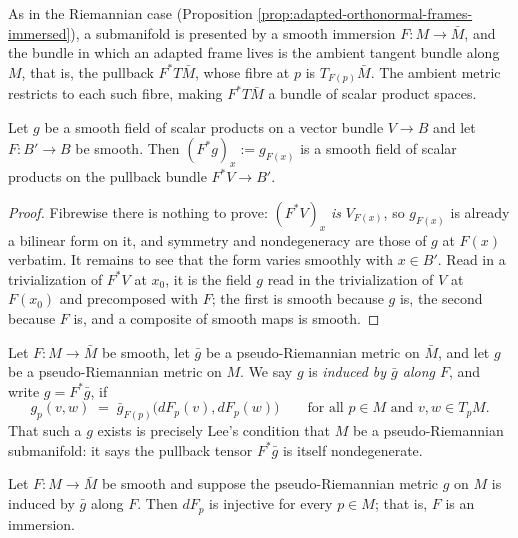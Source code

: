 As in the Riemannian case (Proposition \ref{prop:adapted-orthonormal-frames-immersed}), a submanifold is presented by a smooth immersion $F : M \to \bar{M}$, and the bundle in which an adapted frame lives is the ambient tangent bundle along $M$, that is, the pullback $F^* T\bar{M}$, whose fibre at $p$ is $T_{F(p)}\bar{M}$. The ambient metric restricts to each such fibre, making $F^* T\bar{M}$ a bundle of scalar product spaces.

\begin{lemma}
\label{lem:pullback-pseudo-metric-bundle}
\leanok
{}
Let $g$ be a smooth field of scalar products on a vector bundle $V \to B$ and let $F : B' \to B$ be smooth. Then $(F^* g)_x := g_{F(x)}$ is a smooth field of scalar products on the pullback bundle $F^* V \to B'$.
\end{lemma}

\begin{proof}
\leanok
{}
Fibrewise there is nothing to prove: $(F^*V)_x$ \emph{is} $V_{F(x)}$, so $g_{F(x)}$ is already a bilinear form on it, and symmetry and nondegeneracy are those of $g$ at $F(x)$ verbatim. It remains to see that the form varies smoothly with $x \in B'$. Read in a trivialization of $F^*V$ at $x_0$, it is the field $g$ read in the trivialization of $V$ at $F(x_0)$ and precomposed with $F$; the first is smooth because $g$ is, the second because $F$ is, and a composite of smooth maps is smooth.
\end{proof}

\begin{definition}
\label{def:induced-tensor-along-map}
\leanok
{}
Let $F : M \to \bar{M}$ be smooth, let $\bar{g}$ be a pseudo-Riemannian metric on $\bar{M}$, and let $g$ be a pseudo-Riemannian metric on $M$. We say $g$ is \emph{induced by $\bar{g}$ along $F$}, and write $g = F^*\bar{g}$, if
\[
  g_p(v,w) \;=\; \bar{g}_{F(p)}\bigl(dF_p(v), dF_p(w)\bigr)
  \qquad\text{for all } p \in M \text{ and } v,w \in T_pM.
\]
That such a $g$ exists is precisely Lee's condition that $M$ be a pseudo-Riemannian submanifold: it says the pullback tensor $F^*\bar{g}$ is itself nondegenerate.
\end{definition}

\begin{lemma}
\label{lem:pseudo-submanifold-immersion}
\leanok
{}
Let $F : M \to \bar{M}$ be smooth and suppose the pseudo-Riemannian metric $g$ on $M$ is induced by $\bar{g}$ along $F$. Then $dF_p$ is injective for every $p \in M$; that is, $F$ is an immersion.
\end{lemma}

